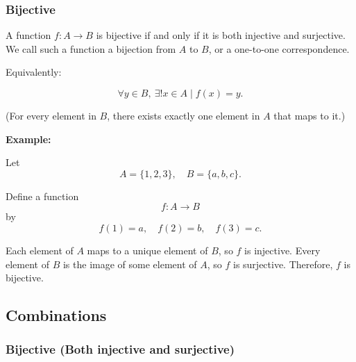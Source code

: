 \documentclass[12pt,a4paper,openany]{article}
\begin{document}
\subsubsection{Bijective}

A function $f : A \rightarrow B$ is bijective if and only if it is both injective and surjective. We call such a function a bijection from $A$ to $B$, or a one-to-one correspondence.

Equivalently:

\[
\forall y \in B,\ \exists! x \in A \mid f(x) = y.
\]

(For every element in $B$, there exists exactly one element in $A$ that maps to it.)

\begin{center}
\end{center}

\textbf{Example:}

Let
\[
A = \{1, 2, 3\}, \quad B = \{a, b, c\}.
\]

Define a function
\[
f : A \to B
\]
by
\[
f(1) = a, \quad f(2) = b, \quad f(3) = c.
\]

Each element of $A$ maps to a unique element of $B$, so $f$ is injective. Every element of $B$ is the image of some element of $A$, so $f$ is surjective. Therefore, $f$ is bijective.

\subsection{Combinations}

\subsubsection{Bijective (Both injective and surjective)}
\end{document}
